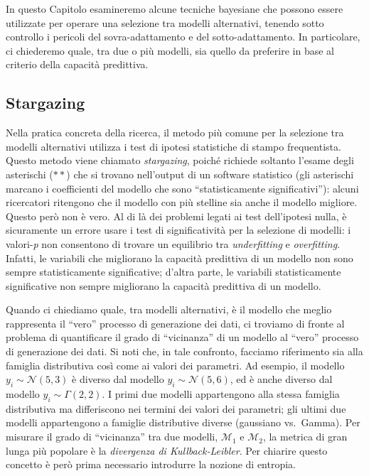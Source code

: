 \documentclass[
  10pt,
  italian,
  a4paper,
  extrafontsizes,onecolumn,openright
  ]{memoir}
\newlength{\rf}
\theoremstyle{definition}
\theoremstyle{definition}
\theoremstyle{definition}
\theoremstyle{definition}
\theoremstyle{remark}
\begin{document}
In questo Capitolo esamineremo alcune tecniche bayesiane che possono essere utilizzate per operare una selezione tra modelli alternativi, tenendo sotto controllo i pericoli del sovra-adattamento e del sotto-adattamento. In particolare, ci chiederemo quale, tra due o più modelli, sia quello da preferire in base al criterio della capacità predittiva.

\hypertarget{stargazing}{%
\subsection{Stargazing}\label{stargazing}}

Nella pratica concreta della ricerca, il metodo più comune per la selezione tra modelli alternativi utilizza i test di ipotesi statistiche di stampo frequentista. Questo metodo viene chiamato \emph{stargazing}, poiché richiede soltanto l'esame degli asterischi (\(**\)) che si trovano nell'output di un software statistico (gli asterischi marcano i coefficienti del modello che sono ``statisticamente significativi''): alcuni ricercatori ritengono che il modello con più stelline sia anche il modello migliore. Questo però non è vero. Al di là dei problemi legati ai test dell'ipotesi nulla, è sicuramente un errore usare i test di significatività per la selezione di modelli: i valori-\emph{p} non consentono di trovare un equilibrio tra \emph{underfitting} e \emph{overfitting}. Infatti, le variabili che migliorano la capacità predittiva di un modello non sono sempre statisticamente significative; d'altra parte, le variabili statisticamente significative non sempre migliorano la capacità predittiva di un modello.

Quando ci chiediamo quale, tra modelli alternativi, è il modello che meglio rappresenta il ``vero'' processo di generazione dei dati, ci troviamo di fronte al problema di quantificare il grado di ``vicinanza'' di un modello al ``vero'' processo di generazione dei dati. Si noti che, in tale confronto, facciamo riferimento sia alla famiglia distributiva così come ai valori dei parametri. Ad esempio, il modello \(y_i \sim \mathcal{N}(5, 3)\) è diverso dal modello \(y_i \sim \mathcal{N}(5, 6)\), ed è anche diverso dal modello \(y_i \sim \Gamma(2, 2)\). I primi due modelli appartengono alla stessa famiglia distributiva ma differiscono nei termini dei valori dei parametri; gli ultimi due modelli appartengono a famiglie distributive diverse (gaussiano vs.~Gamma). Per misurare il grado di ``vicinanza'' tra due modelli, \(\mathcal{M}_1\) e \(\mathcal{M}_2\), la metrica di gran lunga più popolare è la \emph{divergenza di Kullback-Leibler}. Per chiarire questo concetto è però prima necessario introdurre la nozione di entropia.
\end{document}
